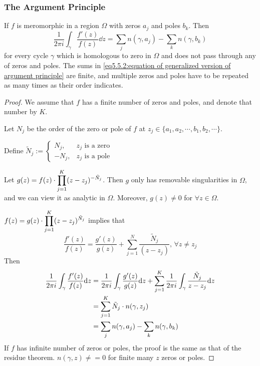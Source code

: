 \subsubsection{The Argument Principle}
\begin{theorem}\label{sec5.5.2:The generalized version of argument principle}
    If  $ f $ is  meromorphic in a region  $ \Omega  $ with zeros  $ a_j  $ and  poles   $ b_k $. Then 
    \begin{equation}\label{eq5.5.2:equation of generalized version of argument principle}
        \frac{1}{2\pi i}\int_\gamma\frac{f'(z)}{f(z)}\dd z=\sum_j n(\gamma,a_j)-\sum_k n(\gamma,b_k)
    \end{equation} 
    for every cycle  $ \gamma  $ which is homologous to zero in  $ \Omega  $ and does not pass through any of zeros and poles. The sums in \eqref{eq5.5.2:equation of generalized version of argument principle} are finite, and multiple zeros and poles have to be repeated as many times as their order indicates.
\end{theorem}
\begin{proof}
    We assume that  $ f  $ has a finite number of zeros and poles, and denote that number by  $ K $.

    Let  $ N_j  $ be the order of the zero or pole of  $ f  $ at  $ z_j\in\{a_1,a_2,\cdots,b_1,b_2,\cdots\}  $.
    
    Define  $ \tilde{N}_j:=\begin{cases}
        N_{j},& z_j\text{ is a zero}\\
        -N_j, & z_j\text{ is a pole}
    \end{cases} $ 
    
    Let  $ g(z)=f(z)\displaystyle\cdot\prod_{j=1}^K(z-z_j)^{-\tilde{N}_j} $. Then  $ g  $ only has removable singularities in  $ \Omega $, and we can view it as analytic in  $ \Omega $.
    Moreover,  $ g(z)\neq 0  $ for  $ \forall z\in \Omega  $.

     $ f(z)=g(z)\displaystyle\cdot\prod_{j=1}^K(z-z_j)^{\tilde{N}_j} $ implies that 
     \begin{equation}
        \frac{f'(z)}{f(z)}=\frac{g'(z)}{g(z)}+\sum_{j=1}^N\frac{\tilde{N}_j}{(z-z_j)},\,\forall z\neq z_j
     \end{equation}
    Then
        \begin{equation*}
            \begin{aligned}
                \displaystyle\frac{1 }{2\pi i}\int_\gamma\frac{f'(z)}{f(z)}\mathrm{d} z&=\frac{1 }{2\pi i}\int_\gamma\frac{g'(z)}{g(z)}\mathrm{d} z+\sum_{j=1}^K\frac{1 }{2\pi i}\int_\gamma\frac{\tilde{N}_j}{z-z_j}\mathrm{d} z\\
                &=\sum_{j=1}^K\tilde{N}_j\cdot n(\gamma,z_j)\\
                &=\sum_j n(\gamma,a_j)-\sum_k n(\gamma,b_k) 
            \end{aligned}
        \end{equation*}
    If  $ f  $ has  infinite number of zeros or poles, the proof is the same as that of the residue theorem. \ie  $ n(\gamma,z)\neq=0 $ for finite many  $ z $ zeros or poles. 
\end{proof}
